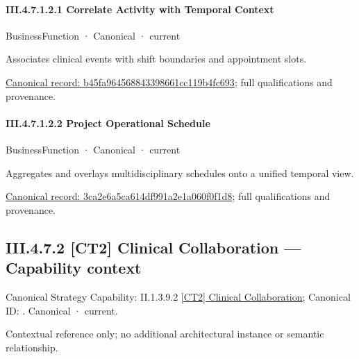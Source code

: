 \paragraph*{III.4.7.1.2.1 Correlate Activity with Temporal Context}
\label{navigation:III.4.7.1.2.1}

\label{element:b45fa964568843398661cc119b4fc693}
{\small BusinessFunction · Canonical · current}\par

Associates clinical events with shift boundaries and appointment slots.


{\footnotesize \href{../../../../../../../continuum/business/business-function/b45fa964568843398661cc119b4fc693.md}{Canonical record: b45fa964568843398661cc119b4fc693}; full qualifications and provenance.}\par
\paragraph*{III.4.7.1.2.2 Project Operational Schedule}
\label{navigation:III.4.7.1.2.2}

\label{element:3ca2e6a5ca614df991a2e1a060f0f1d8}
{\small BusinessFunction · Canonical · current}\par

Aggregates and overlays multidisciplinary schedules onto a unified temporal view.


{\footnotesize \href{../../../../../../../continuum/business/business-function/3ca2e6a5ca614df991a2e1a060f0f1d8.md}{Canonical record: 3ca2e6a5ca614df991a2e1a060f0f1d8}; full qualifications and provenance.}\par
\subsection*{III.4.7.2 [CT2] Clinical Collaboration — Capability context}
\label{navigation:III.4.7.2}

{\small Canonical Strategy Capability: II.1.3.9.2 \hyperref[element:e6429225463a44d39f82e490e254e5d4]{[CT2] Clinical Collaboration}; Canonical ID: \texttt{}. Canonical · current.}\par
Contextual reference only; no additional architectural instance or semantic relationship.\par
